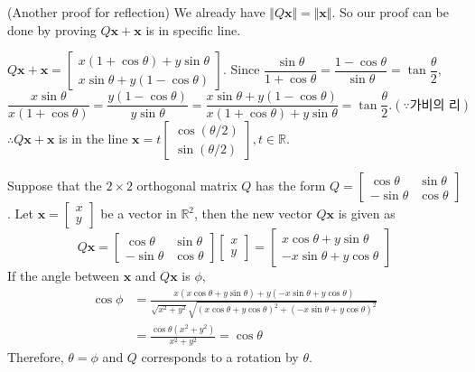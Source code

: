 (Another proof for reflection)
We already have $\Vert Q\textbf{x} \Vert = \Vert \textbf{x} \Vert$. So our proof can be done by proving $ Q\textbf{x}+\textbf{x} $ is in specific line.

$ Q\textbf{x}+\textbf{x}=\begin{bmatrix}
x(1+\cos{\theta})+y\sin{\theta} \\ x\sin{\theta}+y(1-\cos{\theta})
\end{bmatrix} $. Since $ \dfrac{\sin{\theta}}{1+\cos{\theta}}
=\dfrac{1-\cos{\theta}}{\sin{\theta}}=\tan{\dfrac{\theta}{2}} $, \\
$ \dfrac{x\sin{\theta}}{x(1+\cos{\theta})}
=\dfrac{y(1-\cos{\theta})}{y\sin{\theta}}
=\dfrac{x\sin{\theta}+y(1-\cos{\theta})}{x(1+\cos{\theta})+y\sin{\theta}}=\tan{\dfrac{\theta}{2}}. (\because \text{가비의 리}) $ \\
$ \therefore Q\textbf{x}+\textbf{x} $ is in the line $\textbf{x} = t\begin{bmatrix}
\cos(\theta / 2) \\ \sin(\theta / 2)
\end{bmatrix}, t \in \mathbb{R}$.


Suppose that the $2 \times 2$ orthogonal matrix $Q$ has the form $Q = \begin{bmatrix}
	\cos \theta & \sin \theta \\ -\sin \theta & \cos \theta
\end{bmatrix}$. Let $\textbf{x} = \begin{bmatrix}
	x \\ y
\end{bmatrix}$ be a vector in $\mathbb{R}^2$, then the new vector $Q\textbf{x}$ is given as \begin{equation*}
	Q\textbf{x} = \begin{bmatrix}
		\cos \theta & \sin \theta \\ -\sin \theta & \cos \theta
	\end{bmatrix} \begin{bmatrix}
		x \\ y
	\end{bmatrix} = \begin{bmatrix}
		x \cos \theta + y \sin \theta \\ -x \sin \theta + y \cos \theta
	\end{bmatrix}
\end{equation*}
If the angle between $\textbf{x}$ and $Q\textbf{x}$ is $\phi$, \begin{align*}
	\cos \phi &= \frac{x(x \cos \theta + y \sin \theta) + y(-x \sin \theta + y \cos \theta)}{\sqrt{x^2 + y^2}\sqrt{(x \cos \theta + y \cos \theta)^2 + (-x \sin \theta + y \cos \theta)^2}} \\
	&= \frac{\cos\theta(x^2 + y^2)}{x^2 + y^2} = \cos \theta
\end{align*}
Therefore, $\theta = \phi$ and $Q$ corresponds to a rotation by $\theta$. \\

